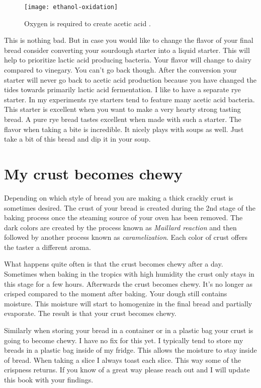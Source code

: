 \begin{figure}[!htb]
  \centering
  \texttt{[image: ethanol-oxidation]}
  \caption{Oxygen is required to create acetic acid \cite{acetic+acid+production}.}
  \label{fig:ethanol-oxidation}
\end{figure}

This is nothing bad. But in case you would like to change
the flavor of your final bread consider converting
your sourdough starter into a liquid starter. This will
help to prioritize lactic acid producing bacteria.
Your flavor will change to dairy compared to vinegary.
You can't go back though. After the conversion your starter
will never go back to acetic acid production because you have
changed the tides towards primarily lactic acid fermentation.
I like to have a separate rye starter. In my experiments
rye starters tend to feature many acetic acid bacteria.
This starter is excellent when you want to make a very hearty
strong tasting bread. A pure rye bread tastes excellent when
made with such a starter. The flavor when taking a bite
is incredible. It nicely plays with soups as well. Just take
a bit of this bread and dip it in your soup.

\section{My crust becomes chewy}

Depending on which style of bread you are making a
thick crackly crust is sometimes desired. The crust
of your bread is created during the 2nd stage of the
baking process once the steaming source of your
oven has been removed. The dark colors are created by
the process known as {\it Maillard reaction} and then followed
by another process known as {\it caramelization}. Each
color of crust offers the taster a different aroma.

What happens quite often is that the crust becomes chewy after a day.
Sometimes when baking in the tropics with high humidity the
crust only stays in this stage for a few hours. Afterwards
the crust becomes chewy. It's no longer as crisped compared
to the moment after baking. Your dough still contains moisture.
This moisture will start to homogenize in the final bread and
partially evaporate. The result is that your crust becomes chewy.

Similarly when storing your bread in a container or in a plastic
bag your crust is going to become chewy. I have no fix for this yet.
I typically tend to store my breads in a plastic bag inside of my fridge.
This allows the moisture to stay inside of bread. When taking a slice
I always toast each slice. This way some of the crispness returns.
If you know of a great way please reach out and I will update
this book with your findings.